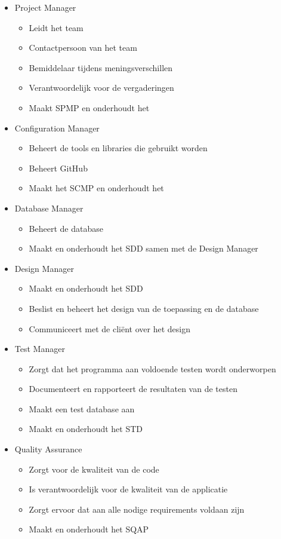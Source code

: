 \begin{itemize}
\item Project Manager
\begin{itemize}
\item Leidt het team
\item Contactpersoon van het team
\item Bemiddelaar tijdens meningsverschillen
\item Verantwoordelijk voor de vergaderingen
\item Maakt SPMP en onderhoudt het
\end{itemize}

\item Configuration Manager
\begin{itemize}
\item Beheert de tools en libraries die gebruikt worden
\item Beheert GitHub
\item Maakt het SCMP en onderhoudt het
\end{itemize}

\item Database Manager
\begin{itemize}
\item Beheert de database
\item Maakt en onderhoudt het SDD samen met de Design Manager
\end{itemize}

\item Design Manager
\begin{itemize}
\item Maakt en onderhoudt het SDD 
\item Beslist en beheert het design van de toepassing en de database
\item Communiceert met de cliënt over het design
\end{itemize}

\item Test Manager
\begin{itemize}
\item Zorgt dat het programma aan voldoende testen wordt onderworpen
\item Documenteert en rapporteert de resultaten van de testen
\item Maakt een test database aan
\item Maakt en onderhoudt het STD
\end{itemize}

\item Quality Assurance
 \begin{itemize}
 \item Zorgt voor de kwaliteit van de code
 \item Is verantwoordelijk voor de kwaliteit van de applicatie
 \item Zorgt ervoor dat aan alle nodige requirements voldaan zijn
 \item Maakt en onderhoudt het SQAP
 \end{itemize}
 

\end{itemize}
